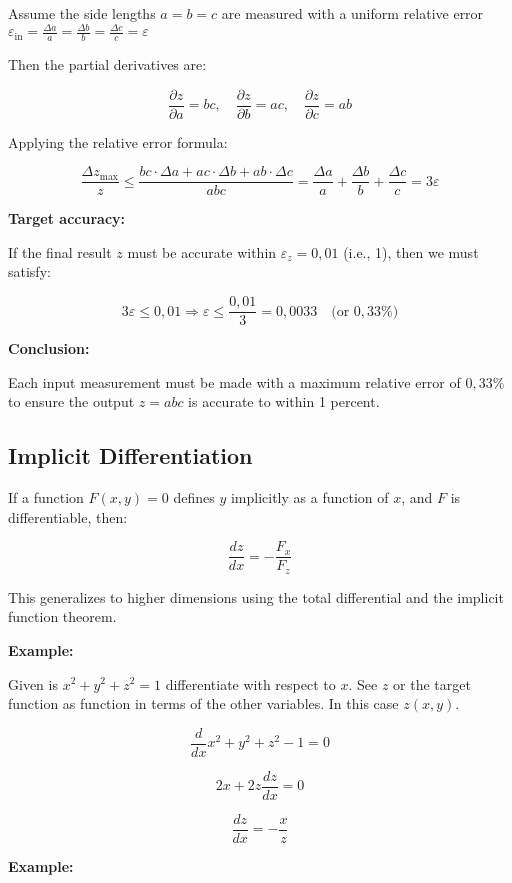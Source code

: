 Assume the side lengths \( a = b = c \) are measured with a uniform relative error 
\( \varepsilon_{\text{in}} = \frac{\Delta a}{a} = \frac{\Delta b}{b} = \frac{\Delta c}{c} = \varepsilon \)

Then the partial derivatives are:

\[
    \frac{\partial z}{\partial a} = b c, \quad
    \frac{\partial z}{\partial b} = a c, \quad
    \frac{\partial z}{\partial c} = a b
\]

Applying the relative error formula:

\[
    \frac{\Delta z_{\max}}{z} \leq \frac{bc \cdot \Delta a + ac \cdot \Delta b + ab \cdot \Delta c}{abc}
    = \frac{\Delta a}{a} + \frac{\Delta b}{b} + \frac{\Delta c}{c} = 3 \varepsilon
\]

\textbf{Target accuracy:}  

If the final result \(z\) must be accurate within \( \varepsilon_z = 0{,}01 \) (i.e., 1), then we must 
satisfy:

\[
    3 \varepsilon \leq 0{,}01 \Rightarrow \varepsilon \leq \frac{0{,}01}{3} = 0,0033 \quad 
    \text{(or } 0,33\% \text{)}
\]

\textbf{Conclusion:}

Each input measurement must be made with a maximum relative error of \( 0,33\% \) to ensure 
the output \( z = abc \) is accurate to within 1 percent.

\subsection{Implicit Differentiation}

If a function \( F(x, y) = 0 \) defines \(y\) implicitly as a function of \(x\), and \(F\) is 
differentiable, then:

\[
    \frac{dz}{dx} = -\frac{F_x}{F_z}
\]

This generalizes to higher dimensions using the total differential and the implicit function theorem.

\textbf{Example:}

Given is \(x^2 + y^2 + z^2 = 1\) differentiate with respect to \(x\).
See \(z\) or the target function as function in terms of the other variables. 
In this case \(z(x,y)\).

\[
    \frac{d}{dx} x^2 + y^2 + z^2  -1 = 0
\]

\[
    2x + 2z \frac{dz}{dx}  = 0
\]

\[
    \frac{dz}{dx} = - \frac{x}{z}
\]

\textbf{Example:}

